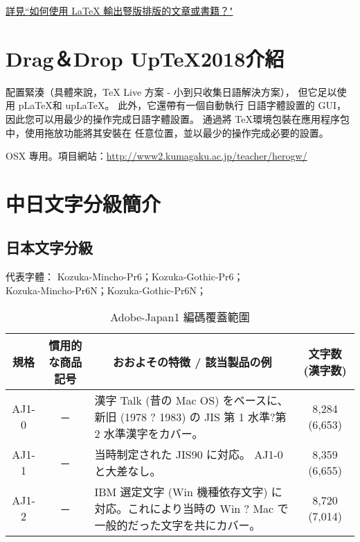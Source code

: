 \documentclass[a4,11pt,uplatex,openleft]{jsarticle}
\begin{document}
\begin{appendix}
\par\href{https://www.zhihu.com/question/20544732/answer/15437234}%
{詳見``如何使用 LaTeX 輸出豎版排版的文章或書籍？"}

\section{ Drag＆Drop Up\TeX 2018介紹}\label{uptex-xiongben}

配置緊湊（具體來說，TeX Live 方案 - 小到只收集日語解決方案），
但它足以使用 p\LaTeX 和 up\LaTeX。 此外，它還帶有一個自動執行
日語字體設置的 GUI，因此您可以用最少的操作完成日語字體設置。
通過將 \TeX 環境包裝在應用程序包中，使用拖放功能將其安裝在
任意位置，並以最少的操作完成必要的設置。

OSX 專用。項目網站：\url{http://www2.kumagaku.ac.jp/teacher/herogw/}

\clearpage
\section{中日文字分級簡介}
\subsection{日本文字分級}
{\gtfamily
代表字體： Kozuka-Mincho-Pr6；Kozuka-Gothic-Pr6；\\
\qquad \qquad \qquad Kozuka-Mincho-Pr6N；Kozuka-Gothic-Pr6N；}

\begin{table}[h]
\caption{\fontsize{12pt}{15pt}\selectfont Adobe-Japan1 編碼覆蓋範圍} %
\centering %
{\fontsize{9pt}{14}\selectfont\ttfamily
\begin{tabular}{|c|c|p{6cm}|c|}%
\hline  %

規格 & 慣用的な商品記号	& \multicolumn{1}{|c|}{おおよその特徴 / 該当製品の例} & 文字数(漢字数) \\

\hline  %
AJ1-0 &	─	 & 漢字 Talk (昔の Mac OS)
をベースに、新旧 (1978 ? 1983) の JIS 第 1 水準?第 2 水準漢字をカバー。
& 8,284 (6,653) \\
\hline
AJ1-1	& ─ &	当時制定された JIS90 に対応。
AJ1-0 と大差なし。 & 	8,359 (6,655) \\
\hline
AJ1-2	& ─	 &  IBM 選定文字 (Win 機種依存文字)
に対応。これにより当時の Win ? Mac で一般的だった文字を共にカバー。
& 	8,720 (7,014) \\
\hline


\end{tabular}}
\end{table}
\end{appendix}
\end{document}

